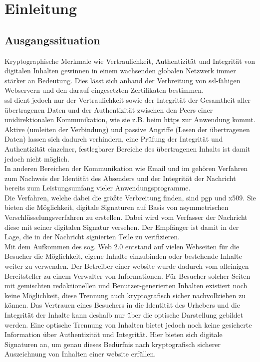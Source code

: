 
\chapter{Einleitung}
%
\label{chp:Einleitung}

\section{Ausgangssituation}
%
\label{sec:Einleitung:ausgangssituation}
Kryptographische Merkmale wie Vertraulichkeit, Authentizität und Integrität von digitalen Inhalten gewinnen in einem wachsenden globalen Netzwerk immer
stärker an Bedeutung. Dies lässt sich anhand der Verbreitung von \gls{ssl}-fähigen Webservern und den darauf eingesetzten Zertifikaten bestimmen\cite{ssliverse:eff}.\\

\gls{ssl} dient jedoch nur der Vertraulichkeit sowie der Integrität der Gesamtheit aller übertragenen Daten und der Authentizität zwischen den Peers einer unidirektionalen
Kommunikation, wie sie z.B. beim \gls{https} zur Anwendung kommt\cite{kits}. Aktive (umleiten der Verbindung) und passive Angriffe (Lesen der übertragenen Daten)
lassen sich dadurch verhindern, eine Prüfung der Integrität und Authentizität einzelner, festlegbarer Bereiche des übertragenen Inhalts ist damit jedoch nicht möglich.\\

In anderen Bereichen der Kommunikation wie Email und \gls{im} gehören Verfahren zum Nachweis der Identität des Absenders und der Integrität der Nachricht
bereits zum Leistungsumfang vieler Anwendungsprogramme\cite{2719799020071101}.\\
Die Verfahren, welche dabei die größte Verbreitung finden, sind \gls{pgp} und \gls{x509}. Sie bieten die Möglichkeit, digitale Signaturen auf Basis von asymmetrischen
Verschlüsselungsverfahren zu erstellen\cite{kits}. Dabei wird vom Verfasser der Nachricht diese mit seiner digitalen Signatur versehen. Der Empfänger ist damit
in der Lage, die in der Nachricht signierten Teile zu verifizieren.\\

Mit dem Aufkommen des sog. Web 2.0 entstand auf vielen Webseiten für die Besucher die Möglichkeit, eigene Inhalte einzubinden oder bestehende Inhalte weiter zu
verwenden. Der Betreiber einer \gls{website} wurde dadurch vom alleinigen Bereitsteller zu einem Verwalter von Informationen. Für Besucher solcher Seiten mit
gemischten redaktionellen und Benutzer-generierten Inhalten existiert noch keine Möglichkeit, diese Trennung auch kryptografisch sicher nachvollziehen zu können.
Das Vertrauen eines Besuchers in die Identität des Urhebers und die Integrität der Inhalte kann deshalb nur über die optische Darstellung gebildet werden. Eine
optische Trennung von Inhalten bietet jedoch noch keine gesicherte Information über Authentizität und Integrität. Hier bieten sich digitale Signaturen  an, um
genau dieses Bedürfnis nach kryptografisch sicherer Auszeichnung von Inhalten einer \gls{website} erfüllen.

